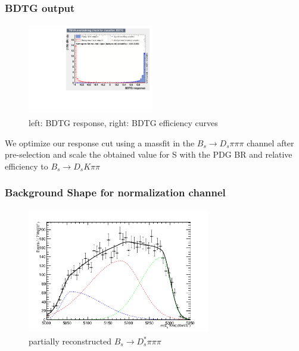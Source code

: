 \documentclass[]{beamer}
\begin{document}
\begin{frame}
\frametitle{BDTG output}

\begin{figure}
\includegraphics[width=5.5cm,height=4.0cm]{pics/BDT_Response_BDTG}
\caption{left: BDTG response, right: BDTG efficiency curves}
\end{figure}

We optimize our response cut using a massfit in the $B_{s}\rightarrow D_{s}\pi\pi\pi$ channel after pre-selection and scale the obtained value for S with the PDG BR and relative efficiency to $B_{s}\rightarrow D_{s}K\pi\pi$   


\end{frame}

\begin{frame}
\frametitle{Background Shape for normalization channel}


 \begin{figure}
\includegraphics[width=8.0cm,height=5.5cm]{pics/Bs2Dsstartpipipi.png}
\caption{partially reconstructed $B_{s}\rightarrow D_{s}^{*}\pi\pi\pi$}
\end{figure}

\end{frame}
\end{document}
